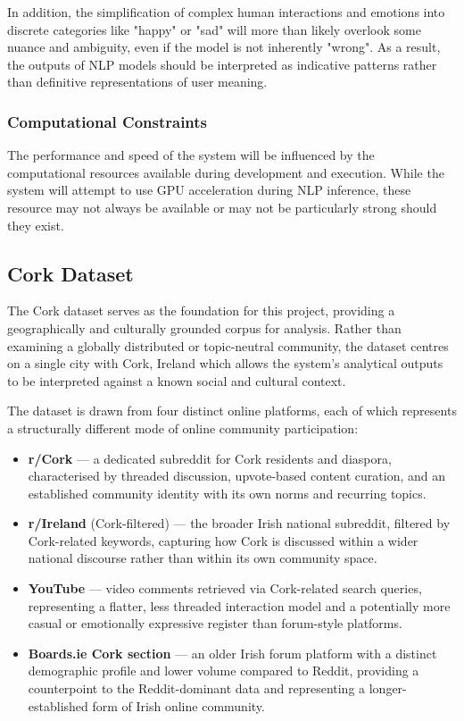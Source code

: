 \documentclass[12pt, a4paper]{article}
\begin{document}
In addition, the simplification of complex human interactions and emotions into discrete categories like "happy" or "sad" will more than likely overlook some nuance and ambiguity, even if the model is not inherently "wrong". As a result, the outputs of NLP models should be interpreted as indicative patterns rather than definitive representations of user meaning.

\subsubsection{Computational Constraints}
The performance and speed of the system will be influenced by the computational resources available during development and execution. While the system will attempt to use GPU acceleration during NLP inference, these resource may not always be available or may not be particularly strong should they exist.

\subsection{Cork Dataset}
\label{sec:cork_dataset}
The Cork dataset serves as the foundation for this project, providing a geographically and culturally grounded corpus for analysis. Rather than examining a globally distributed or topic-neutral community, the dataset centres on a single city with Cork, Ireland which allows the system's analytical outputs to be interpreted against a known social and cultural context.

The dataset is drawn from four distinct online platforms, each of which represents a structurally different mode of online community participation:

\begin{itemize}
    \item \textbf{r/Cork} — a dedicated subreddit for Cork residents and diaspora, characterised by threaded discussion, upvote-based content curation, and an established community identity with its own norms and recurring topics.
    \item \textbf{r/Ireland} (Cork-filtered) — the broader Irish national subreddit, filtered by Cork-related keywords, capturing how Cork is discussed within a wider national discourse rather than within its own community space.
    \item \textbf{YouTube} — video comments retrieved via Cork-related search queries, representing a flatter, less threaded interaction model and a potentially more casual or emotionally expressive register than forum-style platforms.
    \item \textbf{Boards.ie Cork section} — an older Irish forum platform with a distinct demographic profile and lower volume compared to Reddit, providing a counterpoint to the Reddit-dominant data and representing a longer-established form of Irish online community.
\end{itemize}
\end{document}
